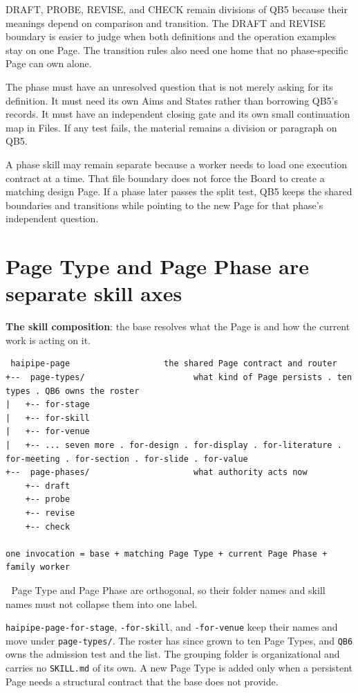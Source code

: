 DRAFT, PROBE, REVISE, and CHECK remain divisions of QB5 because their meanings depend on comparison and transition. The DRAFT and REVISE boundary is easier to judge when both definitions and the operation examples stay on one Page. The transition rules also need one home that no phase-specific Page can own alone.

The phase must have an unresolved question that is not merely asking for its definition. It must need its own Aims and States rather than borrowing QB5's records. It must have an independent closing gate and its own small continuation map in Files. If any test fails, the material remains a division or paragraph on QB5.

A phase skill may remain separate because a worker needs to load one execution contract at a time. That file boundary does not force the Board to create a matching design Page. If a phase later passes the split test, QB5 keeps the shared boundaries and transitions while pointing to the new Page for that phase's independent question.


\section{Page Type and Page Phase are separate skill axes}
\textbf{The skill composition}: the base resolves what the Page is and how the current work is acting on it.

\begin{verbatim}
 haipipe-page                   the shared Page contract and router
+--  page-types/                      what kind of Page persists . ten types . QB6 owns the roster
|   +-- for-stage
|   +-- for-skill
|   +-- for-venue
|   +-- ... seven more . for-design . for-display . for-literature . for-meeting . for-section . for-slide . for-value
+--  page-phases/                     what authority acts now
    +-- draft
    +-- probe
    +-- revise
    +-- check

one invocation = base + matching Page Type + current Page Phase + family worker
\end{verbatim}
📌 Page Type and Page Phase are orthogonal, so their folder names and skill names must not collapse them into one label.

\texttt{haipipe-page-for-stage}, \texttt{-for-skill}, and \texttt{-for-venue} keep their names and move under \texttt{page-types/}. The roster has since grown to ten Page Types, and \texttt{QB6} owns the admission test and the list. The grouping folder is organizational and carries no \texttt{SKILL.md} of its own. A new Page Type is added only when a persistent Page needs a structural contract that the base does not provide.


